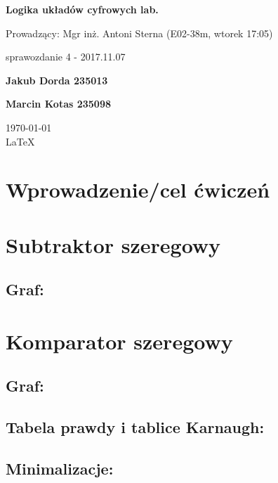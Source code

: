 \documentclass[12pt,a4paper]{article}
\begin{document}
	
	\begin{titlepage}
		
		\centering
		{\huge\bfseries Logika układów cyfrowych lab.\par}
		
		\vspace{0.5cm}
		Prowadzący: Mgr inż. Antoni Sterna (E02-38m, wtorek 17:05) \\
	
		\vspace{1.1cm}
		{\Large sprawozdanie 4 - 2017.11.07\par}
		\vfill
		
		{\large\bfseries Jakub Dorda 235013\par}
		{\large\bfseries Marcin Kotas 235098\par}
		
		\vspace{1cm}
		\today \\ \LaTeX
		
		\restoregeometry
	\end{titlepage}

	\section{Wprowadzenie/cel ćwiczeń}
		
		
	\section{Subtraktor szeregowy}
	
		\subsection{Graf:}
		
			
	\section{Komparator szeregowy}
	
		\subsection{Graf:}
		
	
		\subsection{Tabela prawdy i tablice Karnaugh:}
		
		
		\subsection{Minimalizacje:}
		
\end{document}
